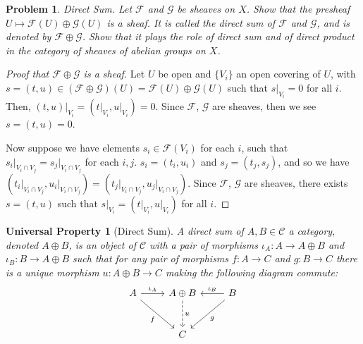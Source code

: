\documentclass[12pt,letterpaper]{article}
\newtheorem*{universalproperty}{Universal Property}
\newtheorem{problem}{Problem}[section]
\theoremstyle{definition}
\theoremstyle{remark}
\numberwithin{equation}{section}
\numberwithin{figure}{problem}
\begin{document}
\begin{problem}
  \emph{Direct Sum}. Let $\mathscr{F}$ and $\mathscr{G}$ be sheaves on $X$. Show that the presheaf $U \mapsto \mathscr{F}(U) \oplus \mathscr{G}(U)$ is a sheaf. It is called the \emph{direct sum} of $\mathscr{F}$ and $\mathscr{G}$, and is denoted by $\mathscr{F} \oplus \mathscr{G}$. Show that it plays the role of direct sum and of direct product in the category of sheaves of abelian groups on $X$.
\end{problem}
\begin{proof}[Proof that $\mathscr{F} \oplus \mathscr{G}$ is a sheaf]
  Let $U$ be open and $\{V_i\}$ an open covering of $U$, with $s = (t,u) \in (\mathscr{F} \oplus \mathscr{G})(U) = \mathscr{F}(U) \oplus \mathscr{G}(U)$ such that $s\vert_{V_i} = 0$ for all $i$. Then, $(t,u)\vert_{V_i} = (t\vert_{V_i}, u\vert_{V_i}) = 0$. Since $\mathscr{F}$, $\mathscr{G}$ are sheaves, then we see $s = (t,u) = 0$.
  \par Now suppose we have elements $s_i \in \mathscr{F}(V_i)$ for each $i$, such that $s_i\vert_{V_i \cap V_j} = s_j\vert_{V_i \cap V_j}$ for each $i,j$. $s_i = (t_i,u_i)$ and $s_j = (t_j,s_j)$, and so we have $(t_i\vert_{V_i \cap V_j},u_i\vert_{V_i \cap V_j}) = (t_j\vert_{V_i \cap V_j},u_j\vert_{V_i \cap V_j})$. Since $\mathscr{F}$, $\mathscr{G}$ are sheaves, there exists $s = (t,u)$ such that $s\vert_{V_i} = (t\vert_{V_i},u\vert_{V_i})$ for all $i$.
\end{proof}
\begin{universalproperty}[Direct Sum]
  A \emph{direct sum} of $A,B \in \mathscr{C}$ a category, denoted $A \oplus B$, is an object of $\mathscr{C}$ with a pair of morphisms $\iota_A\colon A \to A \oplus B$ and $\iota_B\colon B \to A \oplus B$ such that for any pair of morphisms $f\colon A \to C$ and $g\colon B \to C$ there is a unique morphism $u \colon A \oplus B \to C$ making the following diagram commute:
  \begin{equation*}
    \begin{tikzcd}[row sep=large]
      A \rar{\iota_A}\arrow{dr}[swap]{f} & A \oplus B\dar[dashed]{u} & B\lar[swap]{\iota_B}\arrow{dl}{g}\\
      & C
    \end{tikzcd}
  \end{equation*}
\end{universalproperty}
\end{document}
